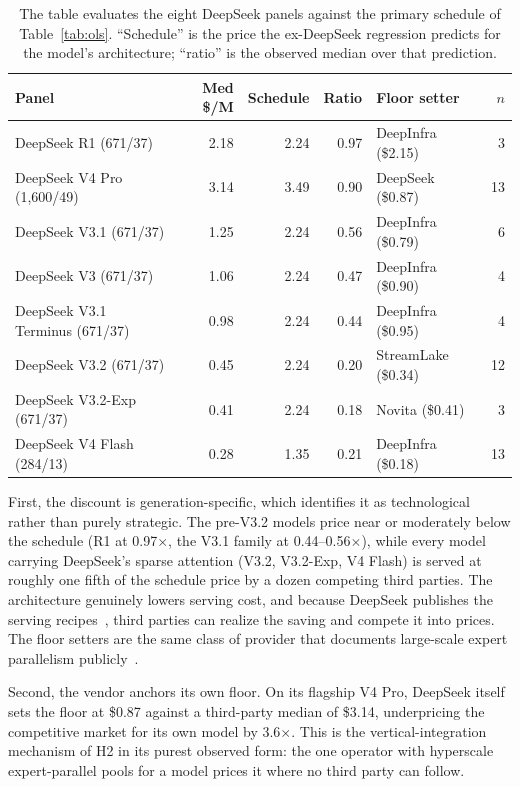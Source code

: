 \documentclass[11pt]{article}
\begin{document}
\begin{table}[t]
\centering
\caption{The table evaluates the eight DeepSeek panels against the primary
schedule of Table~\ref{tab:ols}. ``Schedule'' is the price the ex-DeepSeek
regression predicts for the model's architecture; ``ratio'' is the observed
median over that prediction.}
\label{tab:deepseek}
\small
\begin{tabular}{lrrrlr}
\toprule
Panel & Med \$/M & Schedule & Ratio & Floor setter & $n$ \\
\midrule
DeepSeek R1 (671/37)          & 2.18 & 2.24 & 0.97 & DeepInfra (\$2.15) & 3  \\
DeepSeek V4 Pro (1{,}600/49)  & 3.14 & 3.49 & 0.90 & DeepSeek (\$0.87)  & 13 \\
DeepSeek V3.1 (671/37)        & 1.25 & 2.24 & 0.56 & DeepInfra (\$0.79) & 6  \\
DeepSeek V3 (671/37)          & 1.06 & 2.24 & 0.47 & DeepInfra (\$0.90) & 4  \\
DeepSeek V3.1 Terminus (671/37) & 0.98 & 2.24 & 0.44 & DeepInfra (\$0.95) & 4 \\
DeepSeek V3.2 (671/37)        & 0.45 & 2.24 & 0.20 & StreamLake (\$0.34) & 12 \\
DeepSeek V3.2-Exp (671/37)    & 0.41 & 2.24 & 0.18 & Novita (\$0.41)    & 3  \\
DeepSeek V4 Flash (284/13)    & 0.28 & 1.35 & 0.21 & DeepInfra (\$0.18) & 13 \\
\bottomrule
\end{tabular}
\end{table}

First, the discount is generation-specific, which identifies it as
technological rather than purely strategic. The pre-V3.2 models price near
or moderately below the schedule (R1 at 0.97$\times$, the V3.1 family at
0.44--0.56$\times$), while every model carrying DeepSeek's sparse attention
(V3.2, V3.2-Exp, V4 Flash) is served at roughly one fifth of the schedule
price by a dozen competing third parties. The architecture genuinely lowers
serving cost, and because DeepSeek publishes the serving
recipes~\cite{r10,r8}, third parties can realize the saving and compete it
into prices. The floor setters are the same class of provider that documents
large-scale expert parallelism publicly~\cite{r14}.

Second, the vendor anchors its own floor. On its flagship V4 Pro, DeepSeek itself sets the
floor at \$0.87 against a third-party median of \$3.14, underpricing the
competitive market for its own model by 3.6$\times$. This is the
vertical-integration mechanism of H2 in its purest observed form: the one
operator with hyperscale expert-parallel pools for a model prices it where
no third party can follow.
\end{document}
